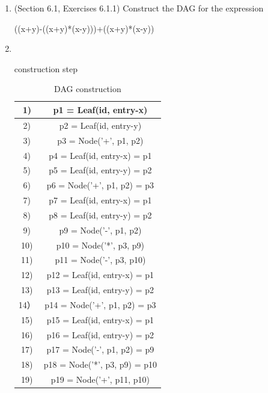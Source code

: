 \documentclass[12pt,a4paper]{article}
\makeatletter
\newtheorem*{solution}{Solution}
\renewenvironment{solution}[1][Solution] {\par\pushQED{\qed}\normalfont\topsep6\p@\@plus6\p@\relax\trivlist\item[\hskip\labelsep\bfseries#1\@addpunct{.}]\ignorespaces}{\popQED\endtrivlist\@endpefalse} \makeatother
\makeatother
\begin{document}
\begin{enumerate}
\item (Section 6.1, Exercises 6.1.1) Construct the DAG for the expression

    \begin{center}
    ((x+y)-((x+y)*(x-y)))+((x+y)*(x-y))
    \end{center}


\begin{solution}
\textrm{\\}

construction step
\begin{table}[h]
    \centering
    \begin{tabular}{|c|c|}
    \hline
    1) & p1 = Leaf(id, entry-x)\\
    \hline
    2) & p2 = Leaf(id, entry-y)\\
    \hline
    3) & p3 = Node('+', p1, p2)\\
    \hline
    4) & p4 = Leaf(id, entry-x) = p1\\
    \hline
    5) & p5 = Leaf(id, entry-y) = p2\\
    \hline
    6) & p6 = Node('+', p1, p2) = p3\\
    \hline
    7) & p7 = Leaf(id, entry-x) = p1\\
    \hline
    8) & p8 = Leaf(id, entry-y) = p2\\
    \hline
    9) & p9 = Node('-', p1, p2)\\
    \hline
    10) & p10 = Node('*', p3, p9)\\
    \hline
    11) & p11 = Node('-', p3, p10)\\
    \hline
    12) & p12 = Leaf(id, entry-x) = p1\\
    \hline
    13) & p13 = Leaf(id, entry-y) = p2\\
    \hline
    14）& p14 = Node('+', p1, p2) = p3\\
    \hline
    15) & p15 = Leaf(id, entry-x) = p1\\
    \hline
    16) & p16 = Leaf(id, entry-y) = p2\\
    \hline
    17) & p17 = Node('-', p1, p2) = p9\\
    \hline
    18) & p18 = Node('*', p3, p9) = p10\\
    \hline
    19) & p19 = Node('+', p11, p10)\\
    \hline 
    \end{tabular}
    \caption{DAG construction}
    \end{table}

\end{solution}
\end{enumerate}
\end{document}
